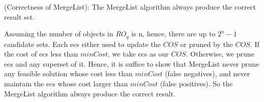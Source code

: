 \begin{thm}
    (Correctness of MergeList): The MergeList algorithm always produce the correct result set.
    \begin{pot}
        Assuming the number of objects in $RO_q$ is n, hence, there are up to $2^n-1$ candidate sets. Each ecs either used to update the $COS$ or pruned by the $COS$. If the cost of ecs less than $minCost$, we take ecs as our $COS$. Otherwise, we prune ecs and any superset of it. Hence, it is suffice to show that MergeList never prune any feasible solution whose cost less than $minCost$ (false negatives), and never maintain the ecs whose cost larger than $minCost$ (false positives). So the MergeList algorithm always produce the correct result.
    \end{pot}
\end{thm}











